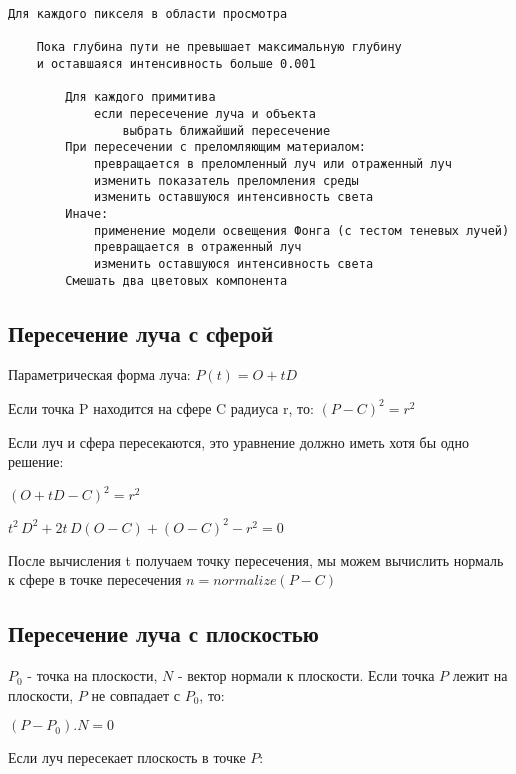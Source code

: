 \begin{verbatim}
Для каждого пикселя в области просмотра

    Пока глубина пути не превышает максимальную глубину
    и оставшаяся интенсивность больше 0.001

        Для каждого примитива
            если пересечение луча и объекта
                выбрать ближайший пересечение
        При пересечении с преломляющим материалом:
            превращается в преломленный луч или отраженный луч
            изменить показатель преломления среды
            изменить оставшуюся интенсивность света
        Иначе:
            применение модели освещения Фонга (с тестом теневых лучей)
            превращается в отраженный луч
            изменить оставшуюся интенсивность света
        Смешать два цветовых компонента
\end{verbatim}


\subsection*{Пересечение луча с сферой}

Параметрическая форма луча:
$P(t) = O + tD$

Если точка P находится на сфере C радиуса r, то:
$(P-C)^2=r^2$

Если луч и сфера пересекаются, это уравнение должно иметь хотя бы одно решение:

$
(O + tD - C)^2 = r^2
$

$
t^2 \, D^2 + 2t \, D(O-C) + (O-C)^2 - r^2 = 0
$

После вычисления t получаем точку пересечения, мы можем вычислить нормаль к сфере в точке пересечения
$n = normalize(P-C)$


\subsection*{Пересечение луча с плоскостью}

$P_0$ - точка на плоскости, $N$ - вектор нормали к плоскости. Если точка $P$ лежит на плоскости, $P$ не совпадает с $P_0$, то:

$(P - P_0).N = 0$

Если луч пересекает плоскость в точке $P$:

